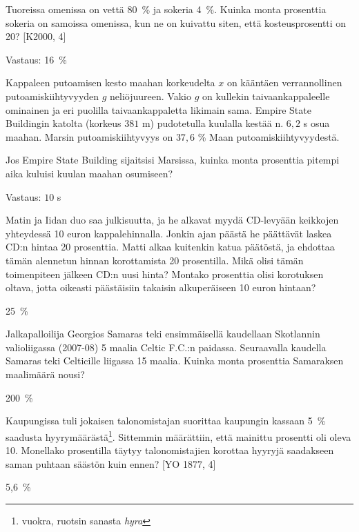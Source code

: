 \begin{tehtava}
    Tuoreissa omenissa on vettä 80~\% ja sokeria 4~\%. Kuinka monta prosenttia sokeria on samoissa omenissa, kun ne on kuivattu siten, että kosteusprosentti on 20? [K2000, 4]
    \begin{vastaus}
        Vastaus: 16~\%
    \end{vastaus}
\end{tehtava}

\begin{tehtava}
    Kappaleen putoamisen kesto maahan korkeudelta $x$ on kääntäen verrannollinen putoamiskiihtyvyyden $g$ neliöjuureen. Vakio $g$ on kullekin taivaankappaleelle ominainen ja eri puolilla taivaankappaletta likimain sama. Empire State Buildingin katolta (korkeus $381$ m) pudotetulla kuulalla kestää n. $6,2$ s osua maahan. Marsin putoamiskiihtyvyys on $37,6$ \% Maan putoamiskiihtyvyydestä. 
    
    Jos Empire State Building sijaitsisi Marsissa, kuinka monta prosenttia pitempi aika kuluisi kuulan maahan osumiseen?
    \begin{vastaus}
        Vastaus: $10$ s
    \end{vastaus}
\end{tehtava}

\begin{tehtava}
Matin ja Iidan duo saa julkisuutta, ja he alkavat myydä CD-levyään keikkojen yhteydessä 10 euron kappalehinnalla. Jonkin ajan päästä he päättävät laskea CD:n hintaa 20 prosenttia. Matti alkaa kuitenkin katua päätöstä, ja ehdottaa tämän alennetun hinnan korottamista 20 prosentilla. Mikä olisi tämän toimenpiteen jälkeen CD:n uusi hinta? Montako prosenttia olisi korotuksen oltava, jotta oikeasti päästäisiin takaisin alkuperäiseen 10 euron hintaan?
    \begin{vastaus}
25~\%
    \end{vastaus}
\end{tehtava}

\begin{tehtava}
Jalkapalloilija Georgios Samaras teki ensimmäisellä kaudellaan Skotlannin valioliigassa (2007-08) 5 maalia Celtic F.C.:n paidassa. Seuraavalla kaudella Samaras teki Celticille liigassa 15 maalia. Kuinka monta prosenttia Samaraksen maalimäärä nousi?
    \begin{vastaus}
200~\%
    \end{vastaus}
\end{tehtava}

\begin{tehtava}
 Kaupungissa tuli jokaisen talonomistajan suorittaa kaupungin kassaan 5~\% saadusta hyyrymäärästä\footnote{vuokra, ruotsin sanasta \emph{hyra}}. Sittemmin määrättiin, että mainittu prosentti oli oleva 10. Monellako prosentilla täytyy talonomistajien korottaa hyyryjä saadakseen saman puhtaan säästön kuin ennen? [YO 1877, 4]
    \begin{vastaus}
5,6~\%
    \end{vastaus}
\end{tehtava}
